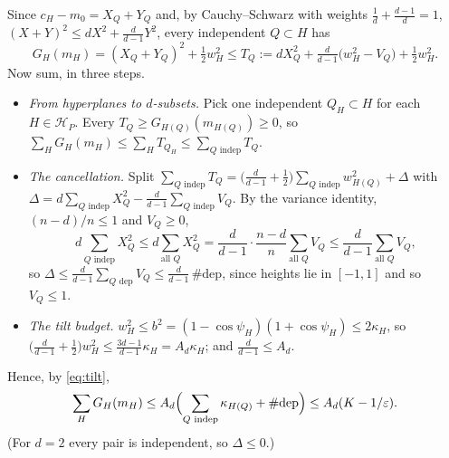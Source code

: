 \documentclass[11pt]{article}
\newcommand{\Adep}{\#\mathrm{dep}}
\begin{document}
Since $c_H - m_0 = X_Q + Y_Q$ and, by Cauchy--Schwarz with weights $\frac1d + \frac{d-1}d = 1$,
$(X + Y)^2 \le d X^2 + \frac{d}{d-1} Y^2$, every independent $Q \subset H$ has
\begin{equation*}
  G_H(m_H) = (X_Q + Y_Q)^2 + \tfrac12 w_H^2 \le T_Q := d X_Q^2 + \tfrac{d}{d-1}\bigl(w_H^2 - V_Q\bigr)
    + \tfrac12 w_H^2 .
\end{equation*}
Now sum, in three steps.
\begin{itemize}
  \item \emph{From hyperplanes to $d$-subsets.} Pick one independent $Q_H \subset H$ for each
    $H \in \mathcal H_P$. Every $T_Q \ge G_{H(Q)}(m_{H(Q)}) \ge 0$, so
    $\sum_H G_H(m_H) \le \sum_H T_{Q_H} \le \sum_{Q \text{ indep}} T_Q$.
  \item \emph{The cancellation.} Split
    $\sum_{Q \text{ indep}} T_Q = \bigl(\frac{d}{d-1} + \frac12\bigr) \sum_{Q \text{ indep}} w_{H(Q)}^2
    + \Delta$ with $\Delta = d \sum_{Q \text{ indep}} X_Q^2 - \frac{d}{d-1} \sum_{Q \text{ indep}} V_Q$.
    By the variance identity, $(n - d)/n \le 1$ and $V_Q \ge 0$,
    \begin{equation*}
      d \sum_{Q \text{ indep}} X_Q^2 \le d \sum_{\text{all } Q} X_Q^2
        = \frac{d}{d-1}\cdot\frac{n-d}{n} \sum_{\text{all } Q} V_Q \le \frac{d}{d-1} \sum_{\text{all } Q} V_Q ,
    \end{equation*}
    so $\Delta \le \frac{d}{d-1} \sum_{Q \text{ dep}} V_Q \le \frac{d}{d-1}\,\Adep$, since heights lie in
    $[-1, 1]$ and so $V_Q \le 1$.
  \item \emph{The tilt budget.} $w_H^2 \le b^2 = (1 - \cos\psi_H)(1 + \cos\psi_H) \le 2\kappa_H$, so
    $\bigl(\frac{d}{d-1} + \frac12\bigr) w_H^2 \le \frac{3d-1}{d-1}\kappa_H = A_d \kappa_H$; and
    $\frac{d}{d-1} \le A_d$.
\end{itemize}
Hence, by \eqref{eq:tilt},
\begin{equation*}
  \sum_H G_H(m_H) \le A_d \Bigl(\sum_{Q \text{ indep}} \kappa_{H(Q)} + \Adep\Bigr) \le A_d (K - 1/\eps).
\end{equation*}
(For $d = 2$ every pair is independent, so $\Delta \le 0$.)
\end{document}
